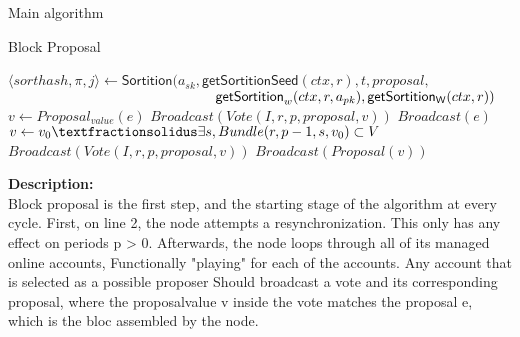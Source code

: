 \documentclass[10pt,a4paper]{article}
\begin{document}
\begin{section}{Main algorithm}
\begin{subsection}{Block Proposal}
\begin{algorithm}
\begin{algorithmic}[1]
                \State $\langle sorthash, \pi, j\rangle\gets 
                \mathsf{Sortition}(
                    a_{sk}, 
                    \mathsf{getSortitionSeed}(ctx, r), 
                    t, 
                    proposal, $ \newline
                    ${}$ ${\hskip 5.2cm}\mathsf{getSortition}_w(ctx, r, a_{pk}), 
                    \mathsf{getSortition_W}(ctx, r)
                )$
                        \State $v \gets Proposal_{value}(e)$
                        \State $Broadcast(Vote(I, r, p, proposal, v))$
                        \State $Broadcast(e)$
                    \Else
                        \State $v \gets v_0 \textfractionsolidus \exists s, Bundle(r,p-1,s,v_0) \subset V$
                        \State $Broadcast(Vote(I, r, p, proposal, v))$
                            \State $Broadcast(Proposal(v))$
                        \EndIf
                    \EndIf
                \EndIf
            \EndFor
        \EndFunction
        \end{algorithmic}
        \caption{\underline{Block proposal}}
    \end{algorithm}

\newpage

\noindent \textbf{Description:}\\
Block proposal is the first step, and the starting stage of the algorithm at every cycle.
First, on line 2, the node attempts a resynchronization. This only has any effect on periods
p > 0.
Afterwards, the node loops through all of its managed online accounts, Functionally
"playing" for each of the accounts. Any account that is selected as a possible proposer
Should broadcast a vote and its corresponding proposal, where the proposalvalue v inside the vote
matches the proposal e, which is the bloc assembled by the node.




\end{subsection}
\end{section}
\end{document}
